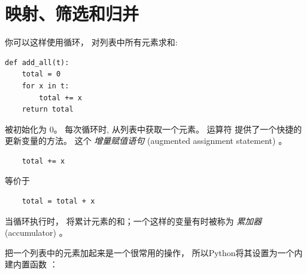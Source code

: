 \section{映射、筛选和归并}
\label{filter}


你可以这样使用循环， 对列表中所有元素求和:


\begin{lstlisting}
def add_all(t):
    total = 0
    for x in t:
        total += x
    return total
\end{lstlisting}
%

 被初始化为 0。  每次循环时,  从列表中获取一个元素。
运算符 \li{+=} 提供了一个快捷的更新变量的方法。  这个 {\em 增量赋值语句} (augmented assignment statement) 。

  
  

\begin{lstlisting}
    total += x
\end{lstlisting}

%

等价于

\begin{lstlisting}
    total = total + x
\end{lstlisting}

%

当循环执行时，  将累计元素的和；一个这样的变量有时被称为 {\em 累加器} (accumulator) 。



把一个列表中的元素加起来是一个很常用的操作，
所以Python将其设置为一个内建内置函数  ：


